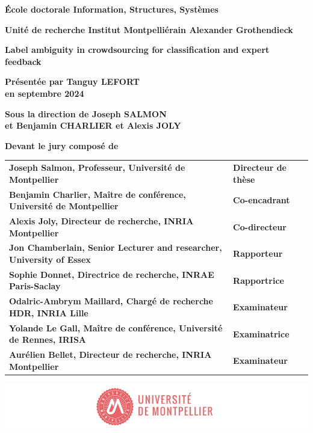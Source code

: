 \documentclass[
a4paper, %
12pt]{book}
\begin{document}
\begin{titlepage}
{\bigskip
\textbf{École doctorale Information, Structures, Systèmes}

\bigskip
\textbf{Unité de recherche Institut Montpelliérain Alexander Grothendieck}


\color{Titleblue}
\fontsize{17}{20.4}\selectfont
\vspace{2cm}
\textbf{Label ambiguity in crowdsourcing for classification and
expert feedback}


\vspace{4cm}
\fontsize{15}{18}\selectfont
\color{black}
\textbf{Présentée par Tanguy LEFORT\\
en septembre 2024}

\bigskip
\fontsize{13}{15.6}\selectfont
\textbf{Sous la direction de Joseph SALMON\\
et Benjamin CHARLIER et Alexis JOLY}

\vspace{1.5cm}
\normalsize
\textbf{Devant le jury composé de}\\
\bigskip
\fontsize{10}{12}\selectfont
\vspace{1.5mm}
\begin{tabular}{p{14cm}l}
\textbf{Joseph Salmon, Professeur, Université de Montpellier} & \textbf{Directeur de thèse} \\
\textbf{Benjamin Charlier, Maître de conférence, Université de Montpellier} & \textbf{Co-encadrant} \\
\textbf{Alexis Joly, Directeur de recherche, INRIA Montpellier} & \textbf{Co-directeur} \\
\textbf{Jon Chamberlain, Senior Lecturer and researcher, University of Essex} & \textbf{Rapporteur} \\
\textbf{Sophie Donnet, Directrice de recherche, INRAE Paris-Saclay} & \textbf{Rapportrice} \\
\textbf{Odalric-Ambrym Maillard, Chargé de recherche HDR, INRIA Lille} & \textbf{Examinateur} \\
\textbf{Yolande Le Gall, Maître de conférence, Université de Rennes, IRISA} & \textbf{Examinatrice} \\
\textbf{Aurélien Bellet, Directeur de recherche, INRIA Montpellier} & \textbf{Examinateur} \\

\end{tabular}

\vspace{\fill}
\includegraphics[scale=1]{images/PhD_Couverture_LogoUM.png}
\vspace{-15mm}}
\end{titlepage}


% 
\end{document}
